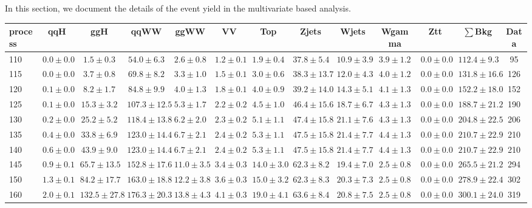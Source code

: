 In this section, we document the details of the event yield in 
the multivariate based analysis.

\begin{table}
{%
 \tiny
 \begin{center}
 \begin{tabular}{l | c c | c c c c c c c c  | c c}
 \hline
 process & qqH & ggH & qqWW & ggWW & VV & Top & Zjets & Wjets & Wgamma & Ztt & $\sum$Bkg & Data \\
 \hline
110 & $0.0\pm0.0$ & $1.5\pm0.3$ & $54.0\pm6.3$ & $2.6\pm0.8$ & $1.2\pm0.1$ & $1.9\pm0.4$ & $37.8\pm5.4$ & $10.9\pm3.9$ & $3.9\pm1.2$ & $0.0\pm0.0$ & $112.4\pm9.3$ & 95 \\
115 & $0.0\pm0.0$ & $3.7\pm0.8$ & $69.8\pm8.2$ & $3.3\pm1.0$ & $1.5\pm0.1$ & $3.0\pm0.6$ & $38.3\pm13.7$ & $12.0\pm4.3$ & $4.0\pm1.2$ & $0.0\pm0.0$ & $131.8\pm16.6$ & 126 \\
120 & $0.1\pm0.0$ & $8.2\pm1.7$ & $84.8\pm9.9$ & $4.0\pm1.3$ & $1.8\pm0.1$ & $4.0\pm0.9$ & $39.2\pm14.0$ & $14.3\pm5.1$ & $4.1\pm1.3$ & $0.0\pm0.0$ & $152.2\pm18.0$ & 152 \\
125 & $0.1\pm0.0$ & $15.3\pm3.2$ & $107.3\pm12.5$ & $5.3\pm1.7$ & $2.2\pm0.2$ & $4.5\pm1.0$ & $46.4\pm15.6$ & $18.7\pm6.7$ & $4.3\pm1.3$ & $0.0\pm0.0$ & $188.7\pm21.2$ & 190 \\
130 & $0.2\pm0.0$ & $25.2\pm5.2$ & $118.4\pm13.8$ & $6.2\pm2.0$ & $2.3\pm0.2$ & $5.1\pm1.1$ & $47.4\pm15.8$ & $21.1\pm7.6$ & $4.3\pm1.3$ & $0.0\pm0.0$ & $204.8\pm22.5$ & 206 \\
135 & $0.4\pm0.0$ & $33.8\pm6.9$ & $123.0\pm14.4$ & $6.7\pm2.1$ & $2.4\pm0.2$ & $5.3\pm1.1$ & $47.5\pm15.8$ & $21.4\pm7.7$ & $4.4\pm1.3$ & $0.0\pm0.0$ & $210.7\pm22.9$ & 210 \\
140 & $0.6\pm0.0$ & $43.9\pm9.0$ & $123.0\pm14.4$ & $6.7\pm2.1$ & $2.4\pm0.2$ & $5.3\pm1.1$ & $47.5\pm15.8$ & $21.4\pm7.7$ & $4.4\pm1.3$ & $0.0\pm0.0$ & $210.7\pm22.9$ & 210 \\
145 & $0.9\pm0.1$ & $65.7\pm13.5$ & $152.8\pm17.6$ & $11.0\pm3.5$ & $3.4\pm0.3$ & $14.0\pm3.0$ & $62.3\pm8.2$ & $19.4\pm7.0$ & $2.5\pm0.8$ & $0.0\pm0.0$ & $265.5\pm21.2$ & 294 \\
150 & $1.3\pm0.1$ & $84.2\pm17.7$ & $163.0\pm18.8$ & $12.2\pm3.8$ & $3.6\pm0.3$ & $15.0\pm3.2$ & $62.3\pm8.3$ & $20.3\pm7.3$ & $2.5\pm0.8$ & $0.0\pm0.0$ & $278.9\pm22.4$ & 302 \\
160 & $2.0\pm0.1$ & $132.5\pm27.8$ & $176.3\pm20.3$ & $13.8\pm4.3$ & $4.1\pm0.3$ & $19.0\pm4.1$ & $63.6\pm8.4$ & $20.8\pm7.5$ & $2.5\pm0.8$ & $0.0\pm0.0$ & $300.1\pm24.0$ & 319 \\

\end{tabular}
\end{center}}
\end{table}
